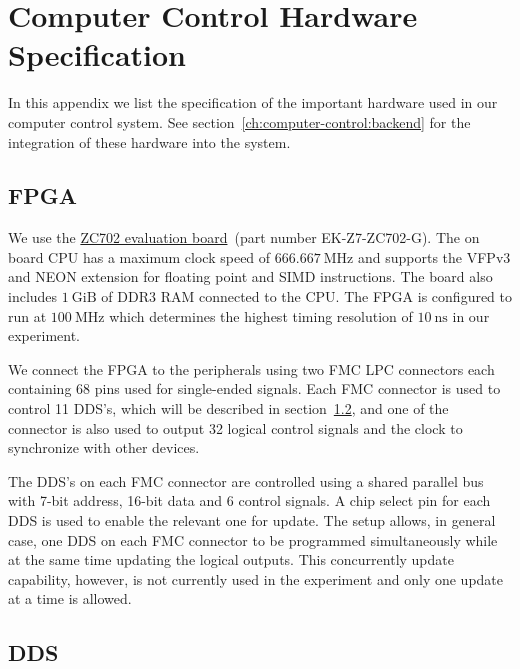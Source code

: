 
\chapter{Computer Control Hardware Specification}
\label{appendex:computer-control}

In this appendix we list the specification of the important hardware
used in our computer control system.
See section~\ref{ch:computer-control:backend} for the integration
of these hardware into the system.

\section{FPGA}
\label{appendex:computer-control:fpga}

We use the \href{https://www.xilinx.com/products/boards-and-kits/ek-z7-zc702-g.html}{ZC702 evaluation board}~(part number EK-Z7-ZC702-G).
The on board CPU has a maximum clock speed of $666.667~\mathrm{MHz}$
and supports the VFPv3 and NEON extension for floating point and SIMD instructions.
The board also includes $1~\mathrm{GiB}$ of DDR3 RAM connected to the CPU.
The FPGA is configured to run at $100~\mathrm{MHz}$ which determines
the highest timing resolution of $10~\mathrm{ns}$ in our experiment.

We connect the FPGA to the peripherals using two FMC LPC connectors
each containing 68 pins used for single-ended signals.
Each FMC connector is used to control 11 DDS's,
which will be described in section~\ref{appendex:computer-control:dds},
and one of the connector is also used to output 32 logical control signals
and the clock to synchronize with other devices.

The DDS's on each FMC connector are controlled using a shared parallel bus
with 7-bit address, 16-bit data and 6 control signals.
A chip select pin for each DDS is used to enable the relevant one for update.
The setup allows, in general case, one DDS on each FMC connector to be programmed
simultaneously while at the same time updating the logical outputs.
This concurrently update capability, however, is not currently used in the experiment
and only one update at a time is allowed.

\section{DDS}
\label{appendex:computer-control:dds}

